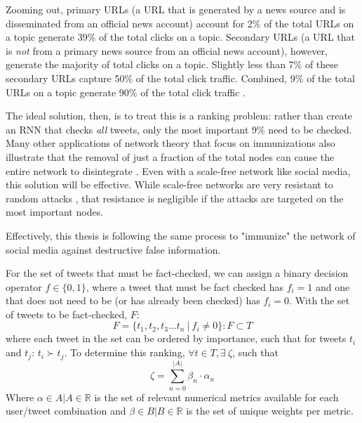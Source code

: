\documentclass[preprint,review,12pt]{elsarticle}
\begin{document}
 Zooming out, primary URLs (a URL that is generated by a news source and is disseminated from an official news account) account for 2\% of the total URLs on a topic generate 39\% of the total clicks on a topic. Secondary URLs (a URL that is \textit{not} from a primary news source from an official news account), however, generate the majority of total clicks on a topic. Slightly less than 7\% of these secondary URLs capture 50\% of the total click traffic. Combined, 9\% of the total URLs on a topic generate 90\% of the total click traffic \cite{gabielkov2016social}. 
 
 The ideal solution, then, is to treat this is a ranking problem: rather than create an RNN that checks \textit{all} tweets, only the most important 9\% need to be checked. Many other applications of network theory that focus on immunizations also illustrate that the removal of just a fraction of the total nodes can cause the entire network to disintegrate \cite{albert2000error,cohen2003efficient,helleringer2007sexual,cohen2001breakdown}. Even with a scale-free network like social media, this solution will be effective. While scale-free networks are very resistant to random attacks \cite{albert2000error,callaway2000network,cohen2000resilience}, that resistance is negligible if the attacks are targeted on the most important nodes.
 
 Effectively, this thesis is following the same process to "immunize" the network of social media against destructive false information.
 
 For the set of tweets that must be fact-checked, we can assign a binary decision operator $f \in \{0,1\}$, where a tweet that must be fact checked has $f_i = 1$ and one that does not need to be (or has already been checked) has $f_i = 0$. With the set of tweets to be fact-checked, $F$:
 \begin{equation}
 \label{Factcheckset}
 F=\{t_1, t_2, t_3 ... t_n \ |\ f_i \neq 0\}: F \subset T
 \end{equation}
 where each tweet in the set can be ordered by importance, such that for tweets $t_i$ and $t_j$: $t_i \succ t_j$. To determine this ranking, $\forall t \in T, \exists \  \zeta$, such that 
 \begin{equation}
     \zeta = \sum_{n=0}^{|A|} \beta_{n} \cdot \alpha_{n}
 \end{equation}
 Where $\alpha \in A | A \in \mathbb{R}$ is the set of relevant numerical metrics available for each user/tweet combination and $\beta \in B| B \in \mathbb{R}$ is the set of unique weights per metric. 
 
\end{document}
